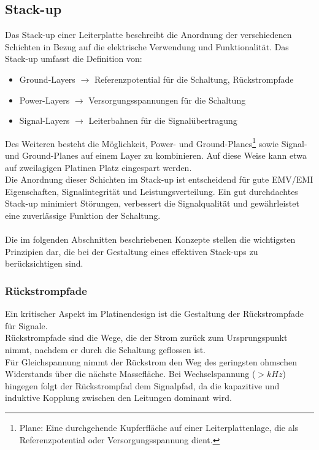 \subsection{Stack-up}
\label{subsec:stackup}
Das Stack-up einer Leiterplatte beschreibt die Anordnung der verschiedenen Schichten in Bezug auf die elektrische Verwendung und Funktionalität. Das Stack-up umfasst die Definition von:
\begin{itemize}
        \item Ground-Layers $\rightarrow$ Referenzpotential für die Schaltung, Rückstrompfade
        \item Power-Layers  $\rightarrow$ Versorgungsspannungen für die Schaltung
        \item Signal-Layers $\rightarrow$ Leiterbahnen für die Signalübertragung
\end{itemize}
Des Weiteren besteht die Möglichkeit, Power- und Ground-Planes\footnote{Plane: Eine durchgehende Kupferfläche auf einer Leiterplattenlage, die als Referenzpotential oder Versorgungsspannung dient.} sowie Signal- und Ground-Planes auf einem Layer zu kombinieren. Auf diese Weise kann etwa auf zweilagigen Platinen Platz eingespart werden.
\\
Die Anordnung dieser Schichten im Stack-up ist entscheidend für gute EMV/EMI Eigenschaften, Signalintegrität und Leistungsverteilung. Ein gut durchdachtes Stack-up minimiert Störungen, verbessert die Signalqualität und gewährleistet eine zuverlässige Funktion der Schaltung.
\\\\
Die im folgenden Abschnitten beschriebenen Konzepte stellen die wichtigsten Prinzipien dar, die bei der Gestaltung eines effektiven Stack-ups zu berücksichtigen sind.
\subsubsection{Rückstrompfade}
\label{subsubsec:rueckstrompfade}
Ein kritischer Aspekt im Platinendesign ist die Gestaltung der Rückstrompfade für Signale. \\Rückstrompfade sind die Wege, die der Strom zurück zum Ursprungspunkt nimmt, nachdem er durch die Schaltung geflossen ist. 
\\
Für Gleichspannung nimmt der Rückstrom den Weg des geringsten ohmschen Widerstands über die nächste Massefläche. Bei Wechselspannung ($>kHz$) hingegen folgt der Rückstrompfad dem Signalpfad, da die kapazitive und induktive Kopplung zwischen den Leitungen dominant wird. \parencite{ZachariahPeterson_Rückstromführung}

